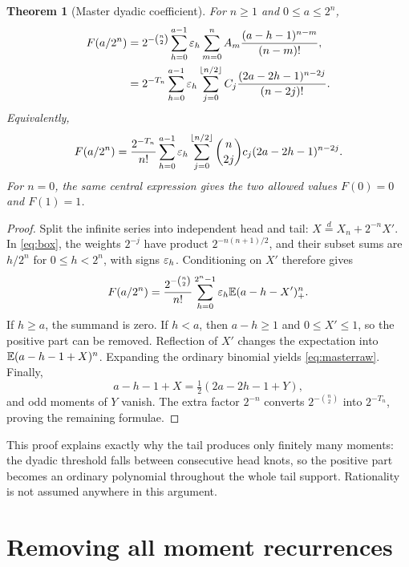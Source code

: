 \documentclass[11pt,oneside]{article}
\newtheorem{theorem}{Theorem}[section]
\theoremstyle{definition}\newtheorem{definition}[theorem]{Definition}
\theoremstyle{remark}\newtheorem{remark}[theorem]{Remark}
\begin{document}
\begin{theorem}[Master dyadic coefficient]
\label{thm:master}
For $n\ge1$ and $0\le a\le2^n$,
\begin{align}
 F(a/2^n)
 &=2^{-\binom n2}\sum_{h=0}^{a-1}\varepsilon_h
       \sum_{m=0}^n A_m\frac{(a-h-1)^{n-m}}{(n-m)!},
 \label{eq:masterraw}\\
 &=2^{-T_n}\sum_{h=0}^{a-1}\varepsilon_h
       \sum_{j=0}^{\lfloor n/2\rfloor}
             C_j\frac{(2a-2h-1)^{n-2j}}{(n-2j)!}.
 \label{eq:mastercentral}
\end{align}
Equivalently,
\begin{equation}
 F(a/2^n)=\frac{2^{-T_n}}{n!}
 \sum_{h=0}^{a-1}\varepsilon_h\sum_{j=0}^{\lfloor n/2\rfloor}
   \binom n{2j}c_j(2a-2h-1)^{n-2j}.
 \label{eq:classical}
\end{equation}
For $n=0$, the same central expression gives the two allowed values $F(0)=0$
and $F(1)=1$.
\end{theorem}
\begin{proof}
Split the infinite series into independent head and tail:
$X\overset d=X_n+2^{-n}X'$. In \eqref{eq:box}, the weights $2^{-j}$ have
product $2^{-n(n+1)/2}$, and their subset sums are $h/2^n$ for
$0\le h<2^n$, with signs $\varepsilon_h$. Conditioning on $X'$ therefore gives
\[
 F(a/2^n)=\frac{2^{-\binom n2}}{n!}
 \sum_{h=0}^{2^n-1}\varepsilon_h\mathbb E(a-h-X')_+^n.
\]
If $h\ge a$, the summand is zero. If $h<a$, then $a-h\ge1$ and $0\le X'\le1$,
so the positive part can be removed. Reflection of $X'$ changes the
expectation into $\mathbb E(a-h-1+X)^n$. Expanding the ordinary binomial yields
\eqref{eq:masterraw}. Finally,
\[
 a-h-1+X=\tfrac12(2a-2h-1+Y),
\]
and odd moments of $Y$ vanish. The extra factor $2^{-n}$ converts
$2^{-\binom n2}$ into $2^{-T_n}$, proving the remaining formulae.
\end{proof}

This proof explains exactly why the tail produces only finitely many moments:
the dyadic threshold falls between consecutive head knots, so the positive
part becomes an ordinary polynomial throughout the whole tail support.
Rationality is not assumed anywhere in this argument.

\section{Removing all moment recurrences}
\label{sec:coefficients}
\end{document}
